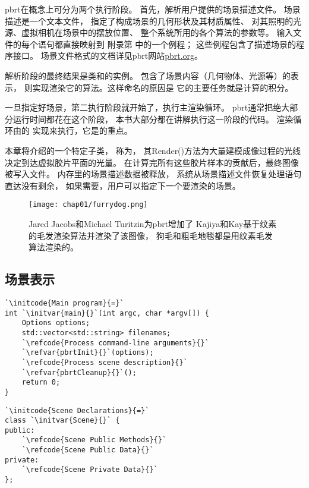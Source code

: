 pbrt在概念上可分为两个执行阶段。
首先，解析用户提供的场景描述文件。
场景描述是一个文本文件，
指定了构成场景的几何形状及其材质属性、
对其照明的光源、虚拟相机在场景中的摆放位置、
整个系统所用的各个算法的参数等。
输入文件的每个语句都直接映射到
附录第
中的一个例程；
这些例程包含了描述场景的程序接口。
场景文件格式的文档详见pbrt网站\href{https://pbrt.org/}{pbrt.org}。

解析阶段的最终结果是类和的实例。
包含了场景内容（几何物体、光源等）的表示，
则实现渲染它的算法。这样命名的原因是
它的主要任务就是计算的积分。

一旦指定好场景，第二执行阶段就开始了，执行主渲染循环。
pbrt通常把绝大部分运行时间都花在这个阶段，
本书大部分都在讲解执行这一阶段的代码。
渲染循环由的
实现来执行，它是的重点。

本章将介绍的一个特定子类，
称为，
其{\ttfamily Render()}方法为大量建模成像过程的光线
决定到达虚拟胶片平面的光量。
在计算完所有这些胶片样本的贡献后，最终图像被写入文件。
内存里的场景描述数据被释放，
系统从场景描述文件恢复处理语句直达没有剩余，
如果需要，用户可以指定下一个要渲染的场景。

\begin{figure}[ht]
    \centering\texttt{[image: chap01/furrydog.png]}
    \caption{Jared Jacobs和Michael Turitzin为pbrt增加了
        Kajiya和Kay基于纹素的毛发渲染算法\citep{10.1145/74333.74361}并渲染了该图像，
        狗毛和粗毛地毯都是用纹素毛发算法渲染的。}
    \label{fig:1.14}
\end{figure}


\subsection{场景表示}\label{sub:场景表示}

\begin{lstlisting}
`\initcode{Main program}{=}`
int `\initvar{main}{}`(int argc, char *argv[]) {
    Options options;
    std::vector<std::string> filenames;
    `\refcode{Process command-line arguments}{}`
    `\refvar{pbrtInit}{}`(options);
    `\refcode{Process scene description}{}`
    `\refvar{pbrtCleanup}{}`();
    return 0;
}
\end{lstlisting}

\begin{lstlisting}
`\initcode{Scene Declarations}{=}`
class `\initvar{Scene}{}` {
public:
    `\refcode{Scene Public Methods}{}`
    `\refcode{Scene Public Data}{}`
private:
    `\refcode{Scene Private Data}{}`
};
\end{lstlisting}


